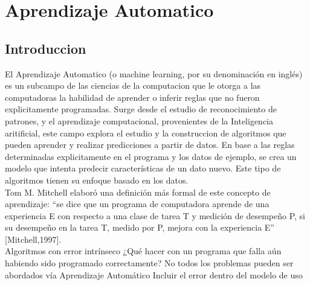 \documentclass[a4paper,12pt,spanish]{book}
\begin{document}



  \section{Aprendizaje Automatico}
    \subsection{Introduccion}
      El Aprendizaje Automatico (o machine learning, por su denominación en inglés) es un subcampo de las ciencias de la computacion que le otorga a las computadoras la habilidad de aprender o inferir reglas que no fueron explicitamente programadas.
      Surge desde el estudio de reconocimiento de patrones, y el aprendizaje computacional, provenientes de la Inteligencia aritificial, este campo explora el estudio y la construccion de algoritmos
      que pueden aprender y realizar predicciones a partir de datos. En base a las reglas determinadas explicitamente en el programa y los datos de ejemplo, se crea un modelo que intenta predecir
      características de un dato nuevo. Este tipo de algoritmos tienen su enfoque basado en los datos.\\
      Tom M. Mitchell elaboró una definición más formal de este concepto de aprendizaje: “se dice que un programa de computadora aprende de una experiencia E con respecto a una clase 
      de tarea T y medición de desempeño P, si su desempeño en la tarea T, medido por P, mejora con la experiencia E” [Mitchell,1997].\\
      Algoritmos con error intrínseco
      ¿Qué hacer con un programa que falla aún habiendo sido programado correctamente?
      No todos los problemas pueden ser abordados vía Aprendizaje Automático
      Incluir el error dentro del modelo de uso
\end{document}
